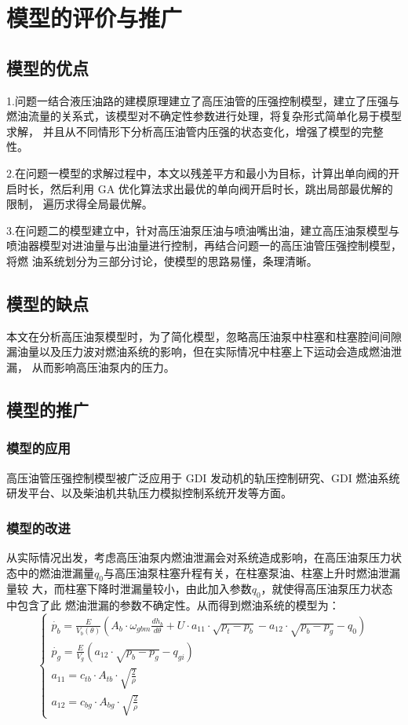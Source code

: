\documentclass{cumcmthesis}
\begin{document}
\section{模型的评价与推广}

\subsection{模型的优点}
1.问题一结合液压油路的建模原理建立了高压油管的压强控制模型，建立了压强与 燃油流量的关系式，该模型对不确定性参数进行处理，将复杂形式简单化易于模型求解， 并且从不同情形下分析高压油管内压强的状态变化，增强了模型的完整性。 

2.在问题一模型的求解过程中，本文以残差平方和最小为目标，计算出单向阀的开 启时长，然后利用 GA 优化算法求出最优的单向阀开启时长，跳出局部最优解的限制， 遍历求得全局最优解。 

3.在问题二的模型建立中，针对高压油泵压油与喷油嘴出油，建立高压油泵模型与 喷油器模型对进油量与出油量进行控制，再结合问题一的高压油管压强控制模型，将燃 油系统划分为三部分讨论，使模型的思路易懂，条理清晰。 

\subsection{模型的缺点 }
本文在分析高压油泵模型时，为了简化模型，忽略高压油泵中柱塞和柱塞腔间间隙 漏油量以及压力波对燃油系统的影响，但在实际情况中柱塞上下运动会造成燃油泄漏， 从而影响高压油泵内的压力。

\subsection{模型的推广 }
\subsubsection{模型的应用}
高压油管压强控制模型被广泛应用于 GDI 发动机的轨压控制研究、GDI 燃油系统 研发平台、以及柴油机共轨压力模拟控制系统开发\textsuperscript{\cite{bib:two}}等方面。 


\subsubsection{模型的改进}
从实际情况出发，考虑高压油泵内燃油泄漏会对系统造成影响，在高压油泵压力状 态中的燃油泄漏量$q_{0}$与高压油泵柱塞升程有关，在柱塞泵油、柱塞上升时燃油泄漏量较 大，而柱塞下降时泄漏量较小，由此加入参数$q_{0}$，就使得高压油泵压力状态中包含了此 燃油泄漏的参数不确定性。从而得到燃油系统的模型为：
\begin{equation*}
\begin{cases}
\dot{p_{b}}=\frac{E}{V_{b}\left(\theta\right)}\left(A_{b}\cdot \omega_{gbm} \frac{dh_{b}}{d\theta}+U\cdot a_{11}\cdot \sqrt{p_{t}-p_{b}}-a_{12}\cdot\sqrt{p_{b}-p_{g}}-q_{0}\right)\\
\dot{p_{g}}=\frac{E}{V_{g}}\left(a_{12}\cdot\sqrt{p_{b}-p_{g}}-q_{gi}\right)\\
a_{11}=c_{tb}\cdot A_{tb}\cdot\sqrt{\frac{2}{\rho}}\\
a_{12}=c_{bg}\cdot A_{bg}\cdot\sqrt{\frac{2}{\rho}}
\end{cases}
\end{equation*} 
\end{document}
